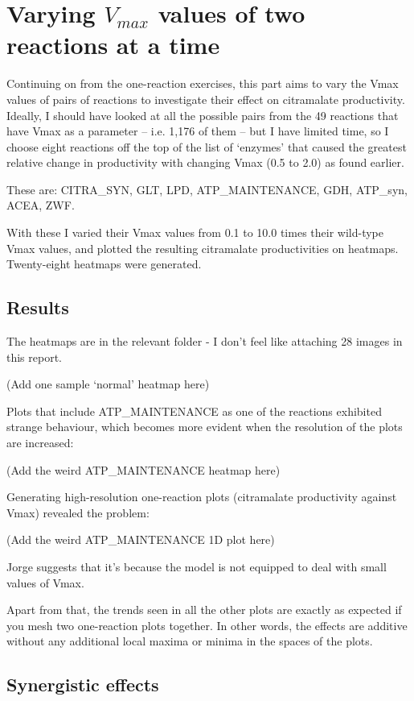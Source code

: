 \documentclass[parskip=full]{scrreprt}
\begin{document}
\section{Varying $V_{max}$ values of two reactions at a time}
\label{sec:couples}

Continuing on from the one-reaction exercises, this part aims to vary the Vmax values of pairs of reactions to investigate their effect on citramalate productivity. Ideally, I should have looked at all the possible pairs from the 49 reactions that have Vmax as a parameter -- i.e. 1,176 of them -- but I have limited time, so I choose eight reactions off the top of the list of ‘enzymes’ that caused the greatest relative change in productivity with changing Vmax (0.5 to 2.0) as found earlier.

These are: CITRA\_SYN, GLT, LPD, ATP\_MAINTENANCE, GDH, ATP\_syn, ACEA, ZWF.

With these I varied their Vmax values from 0.1 to 10.0 times their wild-type Vmax values, and plotted the resulting citramalate productivities on heatmaps. Twenty-eight heatmaps were generated.

\subsection{Results}
\label{ssec:couplesresults}

The heatmaps are in the relevant folder - I don’t feel like attaching 28 images in this report.

(Add one sample `normal' heatmap here)

Plots that include ATP\_MAINTENANCE as one of the reactions exhibited strange behaviour, which becomes more evident when the resolution of the plots are increased:

(Add the weird ATP\_MAINTENANCE heatmap here)

Generating high-resolution one-reaction plots (citramalate productivity against Vmax) revealed the problem:

(Add the weird ATP\_MAINTENANCE 1D plot here)

Jorge suggests that it’s because the model is not equipped to deal with small values of Vmax.

Apart from that, the trends seen in all the other plots are exactly as expected if you mesh two one-reaction plots together. In other words, the effects are additive without any additional local maxima or minima in the spaces of the plots.

\subsection{Synergistic effects}
\label{ssec:synergistic}
\end{document}
